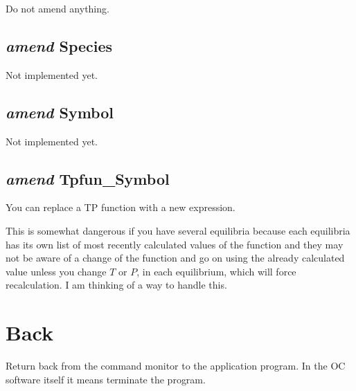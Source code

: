 \documentclass[12pt]{article}
\begin{document}
Do not amend anything.

\subsection{{\em amend} Species}

Not implemented yet.

\subsection{{\em amend} Symbol}

Not implemented yet.

\subsection{{\em amend} Tpfun\_Symbol}

You can replace a TP function with a new expression.

This is somewhat dangerous if you have several equilibria because each
equilibria has its own list of most recently calculated values of the
function and they may not be aware of a change of the function and go
on using the already calculated value unless you change $T$ or $P$, in
each equilibrium, which will force recalculation.  I am thinking of a
way to handle this.

\section{Back }

Return back from the command monitor to the application program.  In
the OC software itself it means terminate the program.
\end{document}
